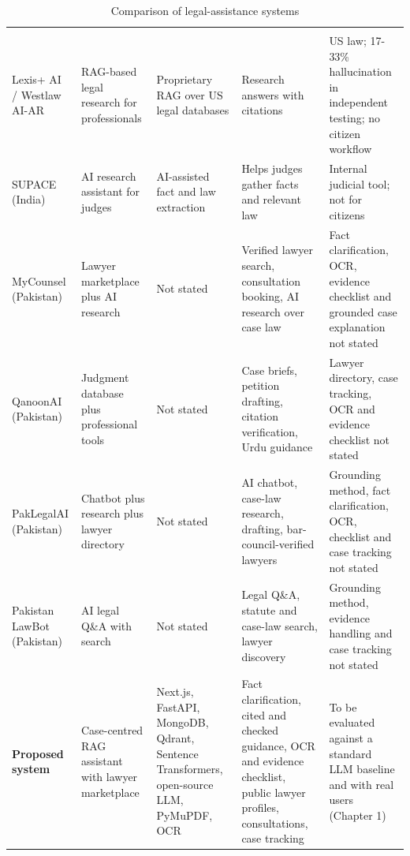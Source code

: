 \begin{longtable}{|L{1.70cm}|L{2.23cm}|L{1.83cm}|L{3.86cm}|L{3.93cm}|}
\caption{Comparison of legal-assistance systems}\label{tab:2.2}\\
\hline\headrow {} &  &  &  &  \\ \hline
\endfirsthead
\hline\headrow {} &  &  &  &  \\ \hline
\endhead
\hline\endlastfoot
Lexis+ AI / Westlaw AI-AR \cite{r9} & RAG-based legal research for professionals & Proprietary RAG over US legal databases & Research answers with citations & US law; 17-33\% hallucination in independent testing; no citizen workflow \\ \hline
SUPACE (India) \cite{r27} & AI research assistant for judges & AI-assisted fact and law extraction & Helps judges gather facts and relevant law & Internal judicial tool; not for citizens \\ \hline
MyCounsel (Pakistan) \cite{r21} & Lawyer marketplace plus AI research & Not stated & Verified lawyer search, consultation booking, AI research over case law & Fact clarification, OCR, evidence checklist and grounded case explanation not stated \\ \hline
QanoonAI (Pakistan) \cite{r22} & Judgment database plus professional tools & Not stated & Case briefs, petition drafting, citation verification, Urdu guidance & Lawyer directory, case tracking, OCR and evidence checklist not stated \\ \hline
PakLegalAI (Pakistan) \cite{r23} & Chatbot plus research plus lawyer directory & Not stated & AI chatbot, case-law research, drafting, bar-council-verified lawyers & Grounding method, fact clarification, OCR, checklist and case tracking not stated \\ \hline
Pakistan LawBot (Pakistan) \cite{r24} & AI legal Q\&A with search & Not stated & Legal Q\&A, statute and case-law search, lawyer discovery & Grounding method, evidence handling and case tracking not stated \\ \hline
\textbf{Proposed system} & Case-centred RAG assistant with lawyer marketplace & Next.js, FastAPI, MongoDB, Qdrant, Sentence Transformers, open-source LLM, PyMuPDF, OCR & Fact clarification, cited and checked guidance, OCR and evidence checklist, public lawyer profiles, consultations, case tracking & To be evaluated against a standard LLM baseline and with real users (Chapter 1) \\
\end{longtable}

